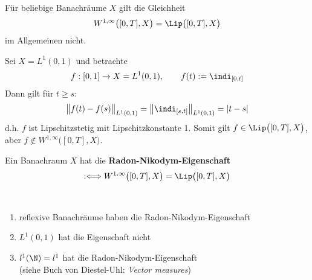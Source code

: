Für beliebige Banachräume $X$ gilt die Gleichheit
\begin{align*}
W^{1,\infty}\big([0,T],X\big)=\Lip\big([0,T],X\big)
\end{align*}
im Allgemeinen nicht.

\begin{beispiel}
Sei $X=L^1(0,1)$ und  betrachte
\begin{align*}
f:[0,1]\to X=L^1(0,1),\qquad f(t):=\indi_{[0,t]}
\end{align*}
Dann gilt für $t\geq s$:
\begin{align*}
\big\Vert f(t)-f(s)\big\Vert_{L^1(0,1)}
=\left\Vert\indi_{[s,t]}\right\Vert_{L^1(0,1)}
=|t-s|
\end{align*}
d.h. $f$ ist Lipschitzstetig mit Lipschitzkonstante 1.
Somit gilt $f\in\Lip\big([0,T],X\big)$, aber $f\not\in W^{1,\infty}\big([0,T],X\big)$.
\end{beispiel}

Ein Banachraum $X$ hat die \textbf{Radon-Nikodym-Eigenschaft}
\begin{align*}
:\Longleftrightarrow W^{1,\infty}\big([0,T],X\big)=\Lip\big([0,T],X\big)
\end{align*}

\begin{beispiel}\
\begin{enumerate}
\item reflexive Banachräume haben die Radon-Nikodym-Eigenschaft
\item $L^1(0,1)$ hat die Eigenschaft nicht
\item $l^1(\N)=l^1$ hat die Radon-Nikodym-Eigenschaft\\
(siehe Buch von Diestel-Uhl: \textit{Vector measures})
\end{enumerate}
\end{beispiel}

